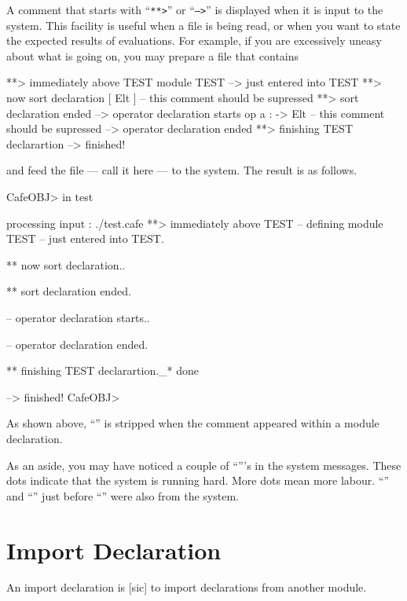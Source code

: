 \documentclass[a4paper]{memoir}
\begin{document}
A comment that starts with ``\texttt{**>}'' or ``\texttt{-->}''
is displayed when it is input to the
system. This facility is useful when a file is being read, or when
you want to state the expected results of evaluations. For example,
if you are excessively uneasy about what is going on, you may prepare
a file that contains
\begin{vvtm}
\begin{ccode}
**> immediately above TEST
module TEST {
--> just entered into TEST
**> now sort declaration
[ Elt ] -- this comment should be supressed
**> sort declaration ended
--> operator declaration starts
op a : -> Elt -- this comment should be supressed
--> operator declaration ended
**> finishing TEST declarartion
}
--> finished!
\end{ccode}
\end{vvtm}
and feed the file --- call it  here --- to the system.
The result is as follows.
\begin{vvtm}
\begin{ccode}
  CafeOBJ> in test

  processing input : ./test.cafe
  **> immediately above TEST
  -- defining module TEST
  -- just entered into TEST.

  ** now sort declaration..

  ** sort declaration ended.

  -- operator declaration starts..

  -- operator declaration ended.

  ** finishing TEST declarartion._* done

  --> finished!
  CafeOBJ>
\end{ccode}
\end{vvtm}
As shown above, ``\kbd{>}'' is stripped when the comment appeared within
a module declaration.

As an aside, you may have noticed a couple of
``'''s in the system messages. These dots indicate that the
system is running hard. More dots mean more labour.
``\kbd{\_}'' and ``\kbd{*}'' just before ``''
were also from the system.

\section{Import Declaration} \label{sec:p2-import-decl}

An import declaration is [sic] to import
declarations from another module.
\end{document}
